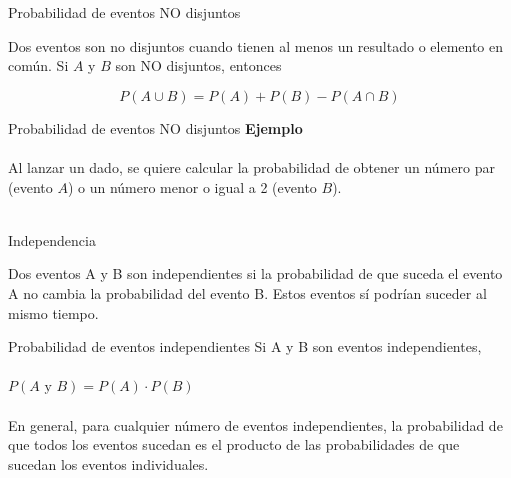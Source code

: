 \documentclass[11pt, aspectratio=169]{beamer}
\begin{document}
\begin{frame}
{Probabilidad de eventos NO disjuntos}{}
 \centering

 Dos eventos son no disjuntos cuando tienen al menos un resultado o elemento
 en común. Si $ A $ y $ B $ son NO disjuntos, entonces

 \[ P(A \cup B) = P(A) + P(B) - P(A \cap B) \]

\end{frame}

\begin{frame}
{Probabilidad de eventos NO disjuntos}{}
 \centering
 \textbf{Ejemplo}\\~\\

 Al lanzar un dado, se quiere calcular la probabilidad de obtener un número
 par (evento $ A $) o un número menor o igual a 2 (evento $ B $).\\~\\

 \pause


\end{frame}

\begin{frame}
{Independencia}{}
 \centering \Large

 Dos eventos A y B son independientes si la probabilidad de que suceda el
 evento A no cambia la probabilidad del evento B. Estos eventos sí podrían
 suceder al mismo tiempo.
\end{frame}

\begin{frame}
{Probabilidad de eventos independientes}{}
 \centering \large
 Si A y B son eventos independientes, \\~\\

 $ P(A  B) = P(A) \cdot P(B) $ \\~\\

 En general, para cualquier número de eventos independientes, la
 probabilidad de que todos los eventos sucedan es el producto de las
 probabilidades de que sucedan los eventos individuales.
\end{frame}
\end{document}
